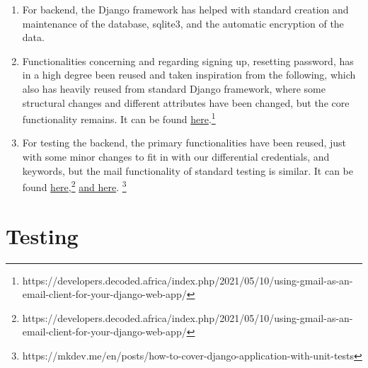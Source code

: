 \documentclass{article}
\begin{document}
\begin{itemize}
\begin{enumerate}
        \item For backend, the Django framework has helped with standard creation and maintenance of the database, sqlite3, and the automatic encryption of the data. 
        \item Functionalities concerning and regarding signing up, resetting password, has in a high degree been reused and taken inspiration from the following, which also has heavily reused from standard Django framework, where some structural changes and different attributes have been changed, but the core functionality remains. It can be found
        \href{https://developers.decoded.africa/index.php/2021/05/10/using-gmail-as-an-email-client-for-your-django-web-app/}{here}.\footnote{https://developers.decoded.africa/index.php/2021/05/10/using-gmail-as-an-email-client-for-your-django-web-app/}
        \item For testing the backend, the primary functionalities have been reused, just with some minor changes to fit in with our differential credentials, and keywords, but the mail functionality of standard testing is similar. It can be found
        \href{https://developers.decoded.africa/index.php/2021/05/10/using-gmail-as-an-email-client-for-your-django-web-app/}{here,}\footnote{https://developers.decoded.africa/index.php/2021/05/10/using-gmail-as-an-email-client-for-your-django-web-app/}
        \href{https://mkdev.me/en/posts/how-to-cover-django-application-with-unit-tests}{and here}.
        \footnote{https://mkdev.me/en/posts/how-to-cover-django-application-with-unit-tests}
    \end{enumerate}
\end{itemize}

\section*{Testing}
\end{document}
